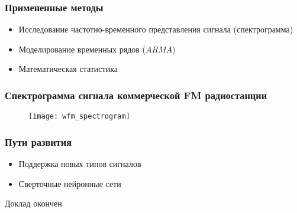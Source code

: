\documentclass[14pt,russian]{beamer}
\begin{document}
\begin{frame}
  \frametitle{Примененные методы}
  \begin{itemize}
    \item{Исследование частотно-временного представления сигнала (спектрограмма)}
    \item{Моделирование временных рядов ($\mathit{ARMA}$)}
    \item{Математическая статистика}
  \end{itemize}
\end{frame}

\begin{frame}
  \frametitle{Спектрограмма сигнала коммерческой FM радиостанции}
  \begin{figure}
    \texttt{[image: wfm\_spectrogram]}
  \end{figure}
\end{frame}

\begin{frame}
  \frametitle{Пути развития}
  \begin{itemize}
    \item{Поддержка новых типов сигналов}
    \item{Сверточные нейронные сети}
  \end{itemize}
\end{frame}

\begin{frame}
  \begin{center}
    \Huge{Доклад окончен}
  \end{center}
\end{frame}
\end{document}

